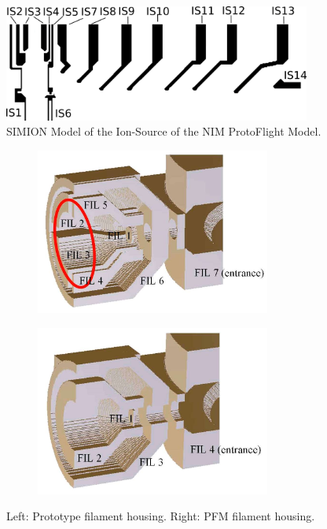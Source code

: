 		\begin{figure}[h]
			\centering
			\includegraphics[width=0.9\textwidth]{Setup/ISFlight_bearb.png}
			\caption{SIMION Model of the Ion-Source of the NIM ProtoFlight Model.}
			\label{fig:SetupPFMISSim}
		\end{figure}
		\begin{figure}[h] %
			\begin{subfigure}{0.5\textwidth}
				\centering
				\includegraphics[width =0.85\textwidth]{Setup/Proto_FilEl_sim.jpg}
			\end{subfigure}
			\begin{subfigure}{0.5\textwidth}
				\centering
				\includegraphics[width = 0.85\textwidth]{Setup/PFM_FilEl_sim.jpg}
			\end{subfigure}
			\caption{Left: Prototype filament housing. Right: PFM filament housing.}
			\label{fig:SetupFilElSim}
		\end{figure}

